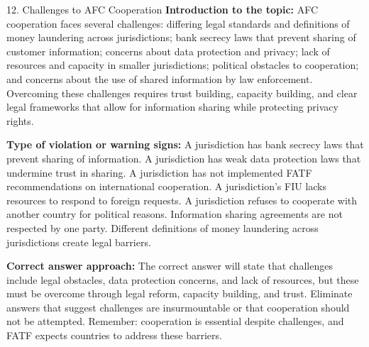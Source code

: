 \documentclass[11pt,a4paper]{beamer}
\begin{document}
\begin{frame}{12. Challenges to AFC Cooperation}
\tiny
\noindent\textbf{Introduction to the topic:} AFC cooperation faces several challenges: differing legal standards and definitions of money laundering across jurisdictions; bank secrecy laws that prevent sharing of customer information; concerns about data protection and privacy; lack of resources and capacity in smaller jurisdictions; political obstacles to cooperation; and concerns about the use of shared information by law enforcement. Overcoming these challenges requires trust building, capacity building, and clear legal frameworks that allow for information sharing while protecting privacy rights.

\vspace{0.1cm}
\noindent\textbf{Type of violation or warning signs:} A jurisdiction has bank secrecy laws that prevent sharing of information. A jurisdiction has weak data protection laws that undermine trust in sharing. A jurisdiction has not implemented FATF recommendations on international cooperation. A jurisdiction's FIU lacks resources to respond to foreign requests. A jurisdiction refuses to cooperate with another country for political reasons. Information sharing agreements are not respected by one party. Different definitions of money laundering across jurisdictions create legal barriers.

\vspace{0.1cm}
\noindent\textbf{Correct answer approach:} The correct answer will state that challenges include legal obstacles, data protection concerns, and lack of resources, but these must be overcome through legal reform, capacity building, and trust. Eliminate answers that suggest challenges are insurmountable or that cooperation should not be attempted. Remember: cooperation is essential despite challenges, and FATF expects countries to address these barriers.
\end{frame}
\end{document}
